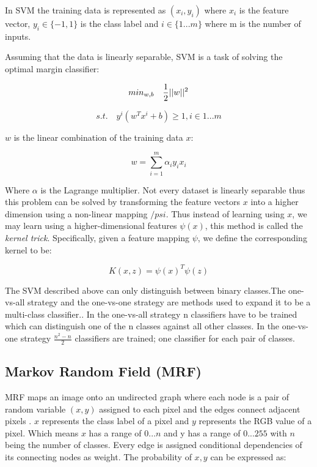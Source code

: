 In SVM the training data is represented as $(x_i,y_i)$ where $x_i$ is the feature vector, $y_i \in \{-1,1\}$ is the class label and $i \in \{1...m\}$ where m is the number of inputs.

Assuming that the data is linearly separable, SVM is a task of solving the optimal margin classifier:

\begin{equation*}
    min_{w,b} \quad \frac{1}{2}||w||^2 \\
\end{equation*}

\begin{equation*}
    s.t. \quad y^{i}(w^T x^i +b)\geqslant 1, i \in {1...m}
\end{equation*}

\vspace{0.1cm}

\noindent $w$ is the linear combination of the training data $x$:

\begin{equation*}
    w = \sum_{i=1}^m \alpha_i y_i x_i
\end{equation*}

\noindent Where $\alpha$ is the Lagrange multiplier. Not every dataset is linearly separable thus this problem can be solved by transforming the feature vectors $x$ into a higher dimension using a non-linear mapping $/psi$. Thus instead of learning using $x$, we may learn using a higher-dimensional features $\psi(x)$, this method is called the \textit{kernel trick}. Specifically, given a feature mapping $\psi$, we define the corresponding kernel to be:    

\begin{equation*}
    K(x,z)=\psi(x)^T\psi(z)
\end{equation*}

The SVM described above can only distinguish between binary classes.The one-vs-all strategy and the one-vs-one strategy are methods used to expand it to be a multi-class classifier.. In the one-vs-all strategy n classifiers have to be trained which can distinguish one of the n classes against all other classes. In the one-vs-one strategy $\frac{n^2-n}{2}$ classifiers are trained; one classifier for each pair of classes.

\subsection{Markov Random Field (MRF)} MRF maps an image onto an undirected graph where each node is a pair of random variable $(x,y)$ assigned to each pixel and the edges connect adjacent pixels \cite{YU201882}. $x$ represents the class label of a pixel and $y$ represents the RGB value of a pixel. Which means $x$ has a range of ${0...n}$ and y has a range of ${0...255}$ with $n$ being the number of classes.  Every edge is assigned conditional dependencies of its connecting nodes as weight. The probability of $x,y$ can be expressed as:

